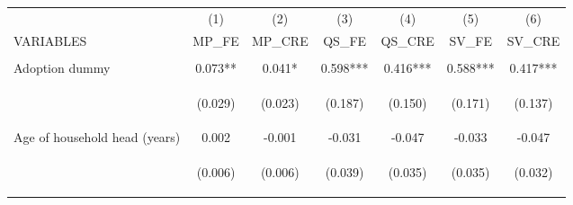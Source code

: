 \begin{center}
\begin{tabular}{lcccccc} \hline
 & (1) & (2) & (3) & (4) & (5) & (6) \\
VARIABLES & MP\_FE & MP\_CRE & QS\_FE & QS\_CRE & SV\_FE & SV\_CRE \\ \hline
\vspace{4pt} & \begin{footnotesize}\end{footnotesize} & \begin{footnotesize}\end{footnotesize} & \begin{footnotesize}\end{footnotesize} & \begin{footnotesize}\end{footnotesize} & \begin{footnotesize}\end{footnotesize} & \begin{footnotesize}\end{footnotesize} \\
Adoption dummy & 0.073** & 0.041* & 0.598*** & 0.416*** & 0.588*** & 0.417*** \\
\vspace{4pt} & \begin{footnotesize}(0.029)\end{footnotesize} & \begin{footnotesize}(0.023)\end{footnotesize} & \begin{footnotesize}(0.187)\end{footnotesize} & \begin{footnotesize}(0.150)\end{footnotesize} & \begin{footnotesize}(0.171)\end{footnotesize} & \begin{footnotesize}(0.137)\end{footnotesize} \\
Age of household head (years) & 0.002 & -0.001 & -0.031 & -0.047 & -0.033 & -0.047 \\
\vspace{4pt} & \begin{footnotesize}(0.006)\end{footnotesize} & \begin{footnotesize}(0.006)\end{footnotesize} & \begin{footnotesize}(0.039)\end{footnotesize} & \begin{footnotesize}(0.035)\end{footnotesize} & \begin{footnotesize}(0.035)\end{footnotesize} & \begin{footnotesize}(0.032)\end{footnotesize} \\

\end{tabular}
\end{center}
